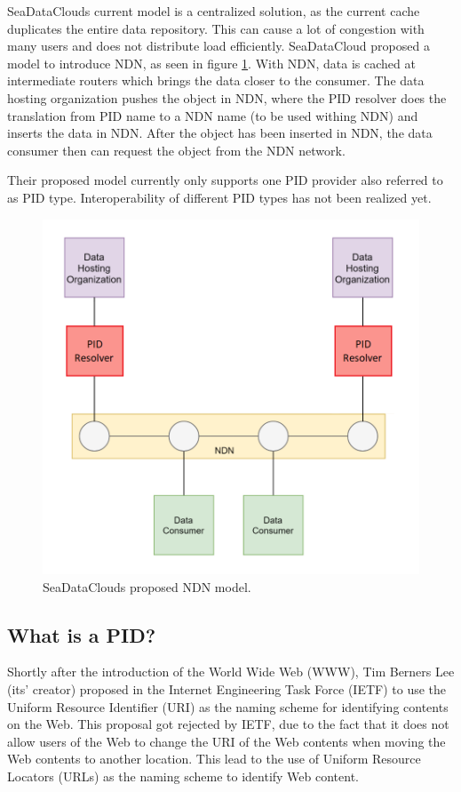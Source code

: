 SeaDataClouds current model is a centralized solution, as the current cache duplicates the entire data repository. This can cause a lot of congestion with many users and does not distribute load efficiently. 
SeaDataCloud proposed a model to introduce NDN, as seen in figure \ref{fig:sdc_ndn}. With NDN, data is cached at intermediate routers which brings the data closer to the consumer. The data hosting organization pushes the object in NDN, where the PID resolver does the translation from PID name to a NDN name (to be used withing NDN) and inserts the data in NDN. After the object has been inserted in NDN, the data consumer then can request the object from the NDN network. 

Their proposed model currently only supports one PID provider also referred to as PID type. Interoperability of different PID types has not been realized yet. 

\begin{figure}[H]
\centering
\includegraphics[scale=0.5]{Images/sdcrp2.png}
\caption{SeaDataClouds proposed NDN model.}
\label{fig:sdc_ndn}
\end{figure}

\subsection{What is a PID?}
Shortly after the introduction of the World Wide Web (WWW), Tim Berners Lee (its' creator) proposed in the Internet Engineering Task Force (IETF) to use the Uniform Resource Identifier (URI) as the naming scheme for identifying 
contents on the Web. This proposal got rejected by IETF, due to the fact that it does not allow users of the Web to change the URI of the Web contents when moving the Web contents to another location. This lead to the use of Uniform Resource Locators (URLs) as the naming scheme to identify Web content.
 

